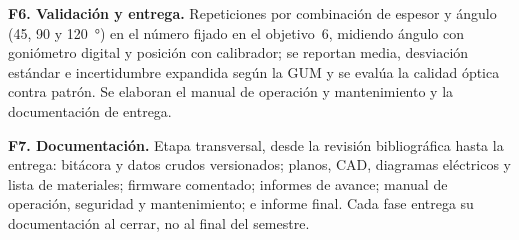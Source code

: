 \noindent\textbf{F6. Validación y entrega.} Repeticiones por combinación de espesor y ángulo (\num{45}, \num{90} y \SI{120}{\degree}) en el número fijado en el objetivo~6, midiendo ángulo con goniómetro digital y posición con calibrador; se reportan media, desviación estándar e incertidumbre expandida según la GUM \cite{gum2008} y se evalúa la calidad óptica contra patrón. Se elaboran el manual de operación y mantenimiento y la documentación de entrega.

\noindent\textbf{F7. Documentación.} Etapa transversal, desde la revisión bibliográfica hasta la entrega: bitácora y datos crudos versionados; planos, CAD, diagramas eléctricos y lista de materiales; firmware comentado; informes de avance; manual de operación, seguridad y mantenimiento; e informe final. Cada fase entrega su documentación al cerrar, no al final del semestre.
